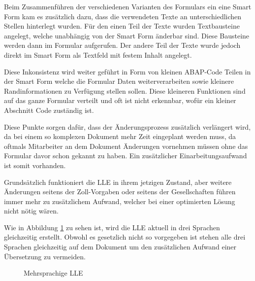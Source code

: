 	Beim Zusammenführen der verschiedenen Varianten des Formulars ein eine Smart Form kam es zusätzlich dazu, dass die verwendeten Texte an unterschiedlichen Stellen hinterlegt wurden. Für den einen Teil der Texte wurden Textbausteine angelegt, welche unabhängig von der Smart Form änderbar sind. Diese Bausteine werden dann im Formular aufgerufen. Der andere Teil der Texte wurde jedoch direkt im Smart Form als Textfeld mit festem Inhalt angelegt. 
	
	Diese Inkonsistenz wird weiter geführt in Form von kleinen \ac{ABAP}-Code Teilen in der Smart Form welche die Formular Daten weiterverarbeiten sowie kleinere Randinformationen zu Verfügung stellen sollen. Diese kleineren Funktionen sind auf das ganze Formular verteilt und oft ist nicht erkennbar, wofür ein kleiner Abschnitt Code zuständig ist.
	

	Diese Punkte sorgen dafür, dass der Änderungsprozess zusätzlich verlängert wird, da bei einem so komplexen Dokument mehr Zeit eingeplant werden muss, da oftmals Mitarbeiter an dem Dokument Änderungen vornehmen müssen ohne das Formular davor schon gekannt zu haben. Ein zusätzlicher Einarbeitungsaufwand ist somit vorhanden.
	
	Grundsätzlich funktioniert die \ac{LLE} in ihrem jetzigen Zustand, aber weitere Änderungen seitens der Zoll-Vorgaben oder seitens der Gesellschaften führen immer mehr zu zusätzlichem Aufwand, welcher bei einer optimierten Lösung nicht nötig wären.
	
	Wie in Abbildung \ref{fig3} zu sehen ist, wird die \ac{LLE} aktuell in drei Sprachen gleichzeitig erstellt. Obwohl es gesetzlich nicht so vorgegeben ist stehen alle drei Sprachen gleichzeitig auf dem Dokument um den zusätzlichen Aufwand einer Übersetzung zu vermeiden.
	
		\begin{figure}[ht]
		\centering
		\caption{Mehrsprachige \ac{LLE}}
		\label{fig3}
	\end{figure}

